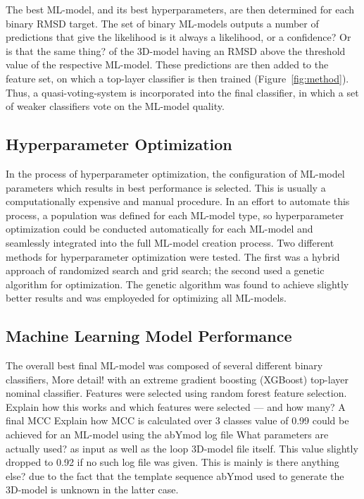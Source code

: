 \documentclass[12pt]{article}
\newcommand{\lilian}[1]{ {\color{red}{\bfseries Lilian:} #1}}
\begin{document}
The best ML-model, and its best hyperparameters, are then determined for
each binary RMSD target. The set of binary ML-models outputs a number of
predictions that give the likelihood\lilian{is it always a likelihood, or a confidence? Or is that the same thing?} of the 3D-model having an RMSD above
the threshold value of the respective ML-model. These predictions are
then added to the feature set, on which a top-layer classifier is then
trained (Figure~\ref{fig:method}). Thus, a quasi-voting-system is incorporated into the final
classifier, in which a set of weaker classifiers vote on the ML-model
quality.

\subsection{Hyperparameter Optimization}
In the process of hyperparameter optimization, the configuration of
ML-model parameters which results in best performance is selected. This
is usually a computationally expensive and manual procedure.
In an effort to automate this process, a population was defined for
each ML-model type, so hyperparameter optimization could be conducted
automatically for each ML-model and seamlessly integrated into the full
ML-model creation process. Two different methods for hyperparameter
optimization were tested. The first was a hybrid approach of randomized
search and grid search; the second used a genetic algorithm for
optimization. The genetic algorithm was found to achieve slightly
better results and was employeded for optimizing all ML-models.

\subsection{Machine Learning Model Performance}
The overall best final ML-model was composed of several different binary
classifiers,\lilian{More detail!} with an extreme gradient boosting (XGBoost) top-layer
nominal classifier. Features were selected using random forest feature
selection.
\lilian{Explain how this works and which features were selected --- and how many?}
A final MCC\lilian{Explain how MCC is calculated over 3 classes} value of 0.99 could be achieved for an ML-model
using the abYmod log file \lilian{What parameters are actually used?} as input as well as the loop 3D-model file
itself. This value slightly dropped to 0.92 if no such log file was
given. This is mainly\lilian{is there anything else?} due to the fact that the template sequence
abYmod used to generate the 3D-model is unknown in the latter case.
\end{document}
